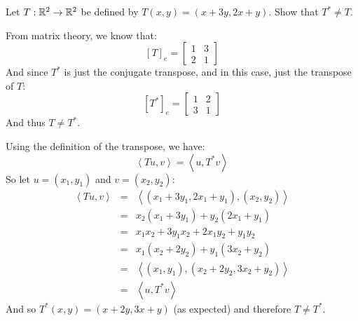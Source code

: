 \documentclass[letterpaper,12pt,fleqn]{article}
\newcommand{\inner}[1]{\left<#1\right>}
\begin{document}
Let $T:\mathbb{R}^2\to\mathbb{R}^2$ be defined by $T(x,y)=(x+3y,2x+y)$. Show that $T^*\ne T$.

From matrix theory, we know that:
\[[T]_e=\begin{bmatrix} 1 & 3 \\ 2 & 1 \end{bmatrix}\]
And since $T^*$ is just the conjugate transpose, and in this case, just the
transpose of $T$:
\[[T^*]_e=\begin{bmatrix} 1 & 2 \\ 3 & 1 \end{bmatrix}\]
And thus $T\ne T^*$.

Using the definition of the transpose, we have:
\[\inner{Tu,v}=\inner{u,T^*v}\]
So let $u=(x_1,y_1)$ and $v=(x_2,y_2)$:
\begin{eqnarray*}
  \inner{Tu,v} &=& \inner{(x_1+3y_1,2x_1+y_1),(x_2,y_2)} \\
  &=& x_2(x_1+3y_1)+y_2(2x_1+y_1) \\
  &=& x_1x_2+3y_1x_2+2x_1y_2+y_1y_2 \\
  &=& x_1(x_2+2y_2)+y_1(3x_2+y_2) \\
  &=& \inner{(x_1,y_1),(x_2+2y_2,3x_2+y_2)} \\
  &=& \inner{u,T^*v}
\end{eqnarray*}
And so $T^*(x,y)=(x+2y,3x+y)$ (as expected) and therefore $T\ne T^*$.
\end{document}
